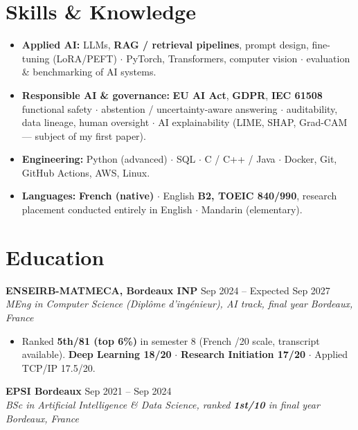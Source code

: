 \documentclass[10pt, letterpaper]{article}
\newcommand{\entry}[4]{%
  \noindent \textbf{#1} \hfill #2 \\
  \textit{#3} \hfill \textit{#4} \par
}
\begin{document}
\section{Skills \& Knowledge}
\begin{itemize}
    \item \textbf{Applied AI:} LLMs, \textbf{RAG / retrieval pipelines}, prompt design, fine-tuning (LoRA/PEFT) $\cdot$ PyTorch, Transformers, computer vision $\cdot$ evaluation \& benchmarking of AI systems.
    \item \textbf{Responsible AI \& governance:} \textbf{EU AI Act}, \textbf{GDPR}, \textbf{IEC 61508} functional safety $\cdot$ abstention / uncertainty-aware answering $\cdot$ auditability, data lineage, human oversight $\cdot$ AI explainability (LIME, SHAP, Grad-CAM --- subject of my first paper).
    \item \textbf{Engineering:} Python (advanced) $\cdot$ SQL $\cdot$ C / C++ / Java $\cdot$ Docker, Git, GitHub Actions, AWS, Linux.
    \item \textbf{Languages:} \textbf{French (native)} $\cdot$ English \textbf{B2, TOEIC 840/990}, research placement conducted entirely in English $\cdot$ Mandarin (elementary).
\end{itemize}

\section{Education}

\entry{ENSEIRB-MATMECA, Bordeaux INP}{Sep 2024 -- Expected Sep 2027}%
{MEng in Computer Science (\textit{Diplôme d'ingénieur}), AI track, final year}{Bordeaux, France}
\begin{itemize}
    \item Ranked \textbf{5th/81 (top 6\%)} in semester 8 (French /20 scale, transcript available). \textbf{Deep Learning 18/20} $\cdot$ \textbf{Research Initiation 17/20} $\cdot$ Applied TCP/IP 17.5/20.
\end{itemize}

\vspace{5pt}

\entry{EPSI Bordeaux}{Sep 2021 -- Sep 2024}%
{BSc in Artificial Intelligence \& Data Science, ranked \textbf{1st/10} in final year}{Bordeaux, France}

\end{document}
